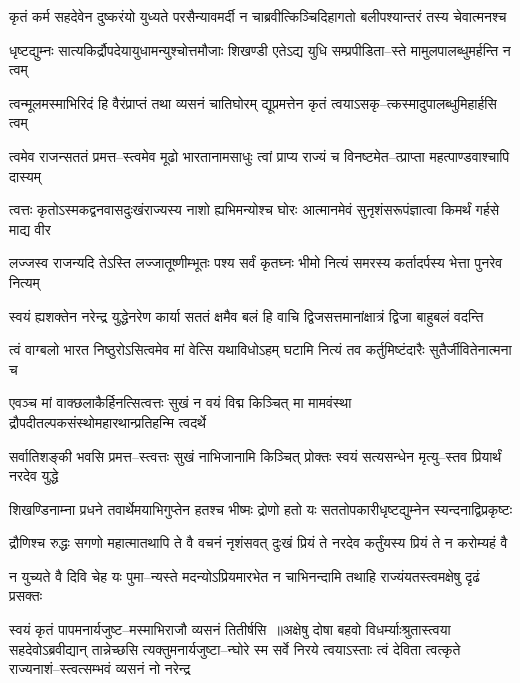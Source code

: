 \twolineshloka
{कृतं कर्म सहदेवेन दुष्करंयो युध्यते परसैन्यावमर्दी}
{न चाब्रवीत्किञ्चिदिहागतो बलीपश्यान्तरं तस्य चेवात्मनश्च}


\twolineshloka
{धृष्टद्युम्नः सात्यकिर्द्रौपदेयायुधामन्युश्चोत्तमौजाः शिखण्डी}
{एतेऽद्य युधि सम्प्रपीडिता--स्ते मामुलपालब्धुमर्हन्ति न त्वम्}


\twolineshloka
{त्वन्मूलमस्माभिरिदं हि वैरंप्राप्तं तथा व्यसनं चातिघोरम्}
{द्यूप्रमत्तेन कृतं त्वयाऽसकृ--त्कस्मादुपालब्धुमिहार्हसि त्वम्}


\twolineshloka
{त्वमेव राजन्सततं प्रमत्त--स्त्वमेव मूढो भारतानामसाधुः}
{त्वां प्राप्य राज्यं च विनष्टमेत--त्प्राप्ता महत्पाण्डवाश्चापि दास्यम्}


\twolineshloka
{त्वत्तः कृतोऽस्मकद्वनवासदुःखंराज्यस्य नाशो ह्यभिमन्योश्च घोरः}
{आत्मानमेवं सुनृशंसरूपंज्ञात्वा किमर्थं गर्हसे माद्य वीर}


\twolineshloka
{लज्जस्व राजन्यदि तेऽस्ति लज्जातूष्णीम्भूतः पश्य सर्वं कृतघ्नः}
{भीमो नित्यं समरस्य कर्तादर्पस्य भेत्ता पुनरेव नित्यम्}


\twolineshloka
{स्वयं ह्यशक्तेन नरेन्द्र युद्धेनरेण कार्या सततं क्षमैव}
{बलं हि वाचि द्विजसत्तमानांक्षात्रं द्विजा बाहुबलं वदन्ति}


\twolineshloka
{त्वं वाग्बलो भारत निष्ठुरोऽसित्वमेव मां वेत्सि यथाविधोऽहम्}
{घटामि नित्यं तव कर्तुमिष्टंदारैः सुतैर्जीवितेनात्मना च}


\twolineshloka
{एवञ्च मां वाक्छलाकैर्हिनत्सित्वत्तः सुखं न वयं विद्म किञ्चित्}
{मा मामवंस्था द्रौपदीतल्पकसंस्थोमहारथान्प्रतिहन्मि त्वदर्थे}


\twolineshloka
{सर्वातिशङ्की भवसि प्रमत्त--स्त्वत्तः सुखं नाभिजानामि किञ्चित्}
{प्रोक्तः स्वयं सत्यसन्धेन मृत्यु--स्तव प्रियार्थं नरदेव युद्धे}


\twolineshloka
{शिखण्डिनाम्ना प्रधने तवार्थेमयाभिगुप्तेन हतश्च भीष्मः}
{द्रोणो हतो यः सततोपकारीधृष्टद्युम्नेन स्यन्दनाद्विप्रकृष्टः}


\twolineshloka
{द्रौणिश्च रुद्धः सगणो महात्मातथापि ते वै वचनं नृशंसवत्}
{दुःखं प्रियं ते नरदेव कर्तुंयस्य प्रियं ते न करोम्यहं वै}


\twolineshloka
{न युच्यते वै दिवि चेह यः पुमा--न्यस्ते मदन्योऽप्रियमारभेत}
{न चाभिनन्दामि तथाहि राज्यंयतस्त्वमक्षेषु दृढं प्रसक्तः}


स्वयं कृतं पापमनार्यजुष्ट--मस्माभिराजौ व्यसनं तितीर्षसि ॥अक्षेषु दोषा बहवो विधर्म्याःश्रुतास्त्वया सहदेवोऽब्रवीद्यान्
\twolineshloka
{तान्नेच्छसि त्यक्तुमनार्यजुष्टा--न्घोरे स्म सर्वे निरये त्वयाऽस्ताः}
{त्वं देविता त्वत्कृते राज्यनाशं--स्त्वत्सम्भवं व्यसनं नो नरेन्द्र}


